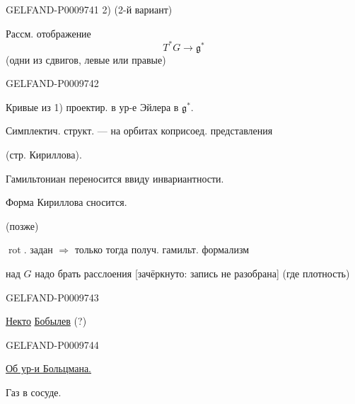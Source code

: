 \begin{GelfandAdjacentEvidence}{GELFAND-P000974}{1}
2) (2-й вариант)

Рассм. отображение
\[
 T^*G\longrightarrow\mathfrak g^*
\]
(одни из сдвигов, левые или правые)
\end{GelfandAdjacentEvidence}
\begin{GelfandAdjacentEvidence}{GELFAND-P000974}{2}


Кривые из 1) проектир. в ур-е Эйлера в $\mathfrak g^*$.

Симплектич. структ. --- на орбитах коприсоед. представления

(стр. Кириллова).

Гамильтониан переносится ввиду инвариантности.

Форма Кириллова сносится.

\quad{}\quad (позже)

$\operatorname{rot}$. задан $\Rightarrow$ только тогда получ. гамильт. формализм

над $G$ надо брать расслоения [зачёркнуто: запись не разобрана] (где плотность)
\end{GelfandAdjacentEvidence}
\begin{GelfandAdjacentEvidence}{GELFAND-P000974}{3}


\underline{\underline{Некто}} \underline{Бобылев} (?)
\end{GelfandAdjacentEvidence}
\begin{GelfandAdjacentEvidence}{GELFAND-P000974}{4}


\underline{Об ур-и Больцмана.}

Газ в сосуде.
\end{GelfandAdjacentEvidence}
